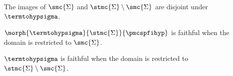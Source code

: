 \begin{corollary}
    The images of \(\smc{\Sigma}\) and \(\stmc{\Sigma} \setminus \smc{\Sigma}\)
    are disjoint under \(\termtohypsigma\).
\end{corollary}

\begin{corollary}\label{cor:termtohyp-faithful-smc}
    \(\morph{\termtohypsigma}{\stmc{\Sigma}}{\pmcspfihyp}\) is faithful when the
    domain is restricted to \(\smc{\Sigma}\).
\end{corollary}

\begin{theorem}
    \(\termtohypsigma\) is faithful when the domain is restricted to \(
        \stmc{\Sigma} \setminus \smc{\Sigma}
    \).
\end{theorem}
